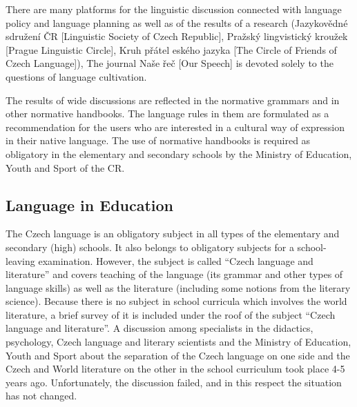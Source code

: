 \begin{multicols}{2}
There are many platforms for the linguistic discussion connected with language policy and language planning as well as of the results of a research (Jazykovědné sdružení ČR [Linguistic Society of Czech Republic], Pražský lingvistický kroužek {[}Prague Linguistic Circle{]}, Kruh přátel
eského jazyka {[}The Circle of Friends of Czech Language{]}), The journal Naše řeč [Our Speech] is devoted solely to the questions of language cultivation.

The results of wide discussions are reflected in the normative grammars and in other normative handbooks. The language rules in them are formulated as a recommendation for the users who are interested in a cultural way of expression in their native language. The use of normative handbooks is required as obligatory in the elementary and secondary schools by the Ministry of Education, Youth and Sport of the CR.

\subsection{Language in Education}

The Czech language is an obligatory subject in all types of the elementary and secondary (high) schools. It also belongs to obligatory subjects for a school-leaving examination. However, the subject is called “Czech language and literature” and covers teaching of the language (its grammar and other types of language skills) as well as the literature (including some notions from the literary science).  Because there is no subject in school curricula which involves the world literature, a brief survey of it is included under the roof of the subject “Czech language and literature”. A discussion among specialists in the didactics, psychology, Czech language and literary scientists and the Ministry of Education, Youth and Sport about the separation of the Czech language on one side and the Czech and World literature on the other in the school curriculum took place 4-5 years ago. Unfortunately, the discussion failed, and in this respect the situation has not changed.


\end{multicols}
